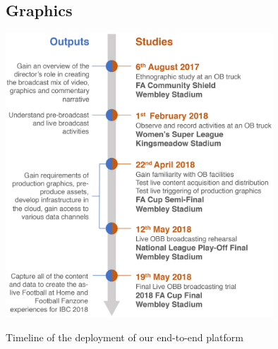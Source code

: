 \documentclass[sigchi-a, authorversion]{acmart}
\begin{document}

\subsection{Graphics}

\begin{marginfigure}
    \hspace*{-2cm}
    \includegraphics[width=10cm]{Figures/timeline.png}
    \caption{Timeline of the deployment of our end-to-end platform}
    \label{fig:timeline}
\end{marginfigure}
\end{document}
